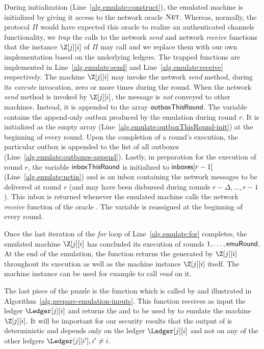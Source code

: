 During initialization (Line~\ref{alg.emulate:construct}),
the emulated machine is
initialized by giving it access to the network oracle $\textsc{Net}$.
Whereas, normally, the protocol $\Pi$ would have expected this
oracle to realize an authenticated channels functionality, we
\emph{trap} the calls to the network \emph{send} and network
\emph{receive} functions that the instance $\Z[j][i]$ of $\Pi$
may call and we replace them with our own implementation based on
the underlying ledgers. The trapped functions are implemented
in Line~\ref{alg.emulate:send} and Line~\ref{alg.emulate:receive}
respectively. The machine $\Z[j][i]$ may invoke the network
\emph{send} method, during its \emph{execute} invocation, zero
or more times during the round. When the network \emph{send} method
is invoked by $\Z[j][i]$, the message is \emph{not} conveyed
to other machines. Instead, it is appended to the array
$\textsf{outboxThisRound}$. The variable contains the append-only
outbox produced by the emulation during round $r$. It is
initialized as the empty array
(Line~\ref{alg.emulate:outboxThisRound-init}) at the beginning
of every round. Upon the completion of a round's execution,
the particular outbox is appended to the list of all outboxes
(Line~\ref{alg.emulate:outboxes-append}).
Lastly, in preparation for the execution of round $r$,
the variable $\textsf{inboxThisRound}$ is initialized to
$\textsf{inboxes}[r - 1]$ (Line~\ref{alg.emulate:netin})
and is an inbox containing the network messages to be
delivered at round $r$ (and may have been disbursed during
rounds $r - \Delta, \ldots, r - 1$). This inbox is returned
whenever the emulated machine calls the network \emph{receive}
function of the oracle \net. The variable \inboxThisRound
is reassigned at the beginning of every round.

Once the last iteration of the \emph{for} loop of Line~\ref{alg.emulate:for} completes,
the emulated machine $\Z[j][i]$ has concluded its execution of rounds $1, \ldots, \textsf{emuRound}$.
At the end of the emulation, the \emulate function returns the \outboxes generated by
$\Z[j][i]$ throughout its execution as well as the machine instance $\Z[j][i]$ itself.
The machine instance can be used for example to call \emph{read} on it.

The last piece of the puzzle is the \prepareEmulationInputs function which is
called by \emulate and illustrated in Algorithm~\ref{alg.prepare-emulation-inputs}. This function receives as input the ledger $\Ledger[j][i]$ and
returns the \writeboxes and \inboxes to be used by \emulate to emulate the machine $\Z[j][i]$. It will be important for
our security results that the output of \prepareEmulationInputs is deterministic
and depends only on the ledger $\Ledger[j][i]$ and not on any of the other ledgers $\Ledger[j][i'], i' \neq i$.

